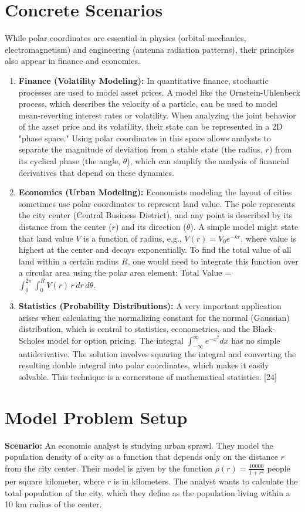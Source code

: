 \documentclass{article}
\begin{document}
\section{Concrete Scenarios}
While polar coordinates are essential in physics (orbital mechanics, electromagnetism) and engineering (antenna radiation patterns), their principles also appear in finance and economics.
\begin{enumerate}
    \item \textbf{Finance (Volatility Modeling):} In quantitative finance, stochastic processes are used to model asset prices. A model like the Ornstein-Uhlenbeck process, which describes the velocity of a particle, can be used to model mean-reverting interest rates or volatility. When analyzing the joint behavior of the asset price and its volatility, their state can be represented in a 2D "phase space." Using polar coordinates in this space allows analysts to separate the magnitude of deviation from a stable state (the radius, $r$) from its cyclical phase (the angle, $\theta$), which can simplify the analysis of financial derivatives that depend on these dynamics.
    \item \textbf{Economics (Urban Modeling):} Economists modeling the layout of cities sometimes use polar coordinates to represent land value. The pole represents the city center (Central Business District), and any point is described by its distance from the center ($r$) and its direction ($\theta$). A simple model might state that land value $V$ is a function of radius, e.g., $V(r) = V_0 e^{-kr}$, where value is highest at the center and decays exponentially. To find the total value of all land within a certain radius $R$, one would need to integrate this function over a circular area using the polar area element: Total Value = $\int_0^{2\pi} \int_0^R V(r) \, r \, dr \, d\theta$.
    \item \textbf{Statistics (Probability Distributions):} A very important application arises when calculating the normalizing constant for the normal (Gaussian) distribution, which is central to statistics, econometrics, and the Black-Scholes model for option pricing. The integral $\int_{-\infty}^{\infty} e^{-x^2} dx$ has no simple antiderivative. The solution involves squaring the integral and converting the resulting double integral into polar coordinates, which makes it easily solvable. This technique is a cornerstone of mathematical statistics. [24]
\end{enumerate}

\section{Model Problem Setup}
\textbf{Scenario:} An economic analyst is studying urban sprawl. They model the population density of a city as a function that depends only on the distance $r$ from the city center. Their model is given by the function $\rho(r) = \frac{10000}{1 + r^2}$ people per square kilometer, where $r$ is in kilometers. The analyst wants to calculate the total population of the city, which they define as the population living within a 10 km radius of the center.
\end{document}
